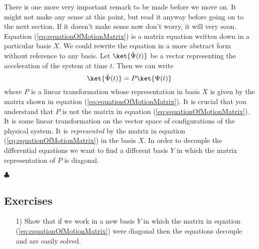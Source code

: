 There is one more very important remark to be made before we move on.
It might not make any sense at this point, but read it anyway before going on to the next section.
If it doesn't make sense now don't worry, it will very soon.
Equation (\ref{eq:equationOfMotionMatrix}) is a matrix equation written down in a particular basis $X$.
We could rewrite the equation in a more abstract form without reference to any basis.
Let $\ket{\ddot{\Psi}(t)}$ be a vector representing the acceleration of the system at time $t$.
Then we can write
\begin{equation}\label{eq:equationOfMotionAbstract}
\ket{\ddot{\Psi}(t)} = P \ket{\Psi (t)}
\end{equation}
where $P$ is a linear transformation whose representation in basis $X$ is given by the matrix shown in equation (\ref{eq:equationOfMotionMatrix}).
It is crucial that you understand that $P$ is not the matrix in equation (\ref{eq:equationOfMotionMatrix}).
It is some linear transformation on the vector space of configurations of the physical system.
It is \emph{represented} by the matrix in equation (\ref{eq:equationOfMotionMatrix}) in the basis $X$.
In order to decouple the differential equations we want to find a different basis $Y$ in which the matrix representation of $P$ is diagonal.
\begin{flushright} $\clubsuit$ \end{flushright}

\subsection{Exercises}
\begin{itemize}
\item[1)] Show that if we work in a new basis $Y$ in which the matrix in equation (\ref{eq:equationOfMotionMatrix}) were diagonal then the equations decouple and are easily solved.
\end{itemize}
